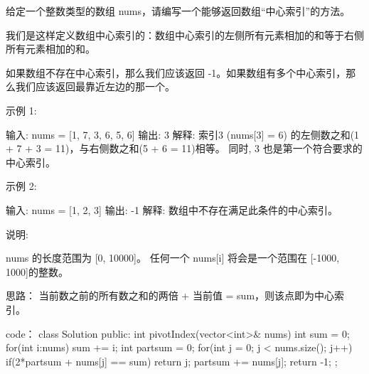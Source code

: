 给定一个整数类型的数组 nums，请编写一个能够返回数组“中心索引”的方法。

我们是这样定义数组中心索引的：数组中心索引的左侧所有元素相加的和等于右侧所有元素相加的和。

如果数组不存在中心索引，那么我们应该返回 -1。如果数组有多个中心索引，那么我们应该返回最靠近左边的那一个。

示例 1:

输入: 
nums = [1, 7, 3, 6, 5, 6]
输出: 3
解释: 
索引3 (nums[3] = 6) 的左侧数之和(1 + 7 + 3 = 11)，与右侧数之和(5 + 6 = 11)相等。
同时, 3 也是第一个符合要求的中心索引。

示例 2:

输入: 
nums = [1, 2, 3]
输出: -1
解释: 
数组中不存在满足此条件的中心索引。

说明:

    nums 的长度范围为 [0, 10000]。
    任何一个 nums[i] 将会是一个范围在 [-1000, 1000]的整数。

































思路：
当前数之前的所有数之和的两倍 + 当前值 = sum，则该点即为中心索引。




















code：
class Solution {
public:
    int pivotIndex(vector<int>& nums) {
        int sum = 0;
        for(int i:nums)
            sum += i;
        int partsum = 0;
        for(int j = 0; j < nums.size(); j++)
        {
            if(2*partsum + nums[j] == sum)
                return j;
            partsum += nums[j];
        }
        return -1;
    }
};